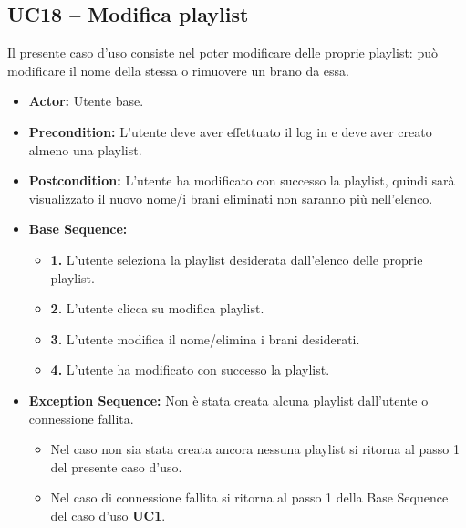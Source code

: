 \subsection{UC18 -- Modifica playlist}
Il presente caso d'uso consiste nel poter modificare delle proprie playlist: può modificare il nome della stessa o rimuovere un brano da essa.
\begin{itemize}
    \item \textbf{Actor:} Utente base.
    \item \textbf{Precondition:} L'utente deve aver effettuato il log in e deve aver creato almeno una playlist.
    \item \textbf{Postcondition:} L'utente ha modificato con successo la playlist, quindi sarà visualizzato il nuovo nome/i brani eliminati non saranno più nell'elenco.
    \item \textbf{Base Sequence:}
    \begin{itemize}
        \item \textbf{1.} L'utente seleziona la playlist desiderata dall'elenco delle proprie playlist.
        \item \textbf{2.} L'utente clicca su modifica playlist.
        \item \textbf{3.} L'utente modifica il nome/elimina i brani desiderati.
        \item \textbf{4.} L'utente ha modificato con successo la playlist.
    \end{itemize}
    \item \textbf{Exception Sequence:} Non è stata creata alcuna playlist dall'utente o connessione fallita.
    \begin{itemize}
        \item Nel caso non sia stata creata ancora nessuna playlist si ritorna al passo 1 del presente caso d'uso.
        \item Nel caso di connessione fallita si ritorna al passo 1 della Base Sequence del caso d'uso \textbf{UC1}.
    \end{itemize}
\end{itemize}
\vspace{1cm}

